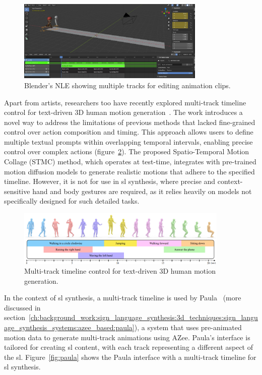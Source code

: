 \documentclass[../../main.tex]{subfiles}
\begin{document}
\begin{figure}
    \centering
    \includegraphics[width=0.8\textwidth]{chapters/background_work/images/nle_blender.png}
    \caption{Blender's NLE showing multiple tracks for editing animation clips.}
    \label{fig:nle_editor}
\end{figure}

Apart from artists, researchers too have recently explored multi-track timeline control for text-driven 3D human motion generation~\cite{petrovich24stmc}. The work introduces a novel way to address the limitations of previous methods that lacked fine-grained control over action composition and timing. This approach allows users to define multiple textual prompts within overlapping temporal intervals, enabling precise control over complex actions (figure~\ref{fig:multi_track_other}). The proposed Spatio-Temporal Motion Collage (STMC) method, which operates at test-time, integrates with pre-trained motion diffusion models to generate realistic motions that adhere to the specified timeline. However, it is not for use in \gls{sl} synthesis, where precise and context-sensitive hand and body gestures are required, as it relies heavily on models not specifically designed for such detailed tasks.

\begin{figure}
    \centering
    \includegraphics[width=0.9\textwidth]{chapters/background_work/images/multi_track_other.png}
    \caption{Multi-track timeline control for text-driven 3D human motion generation.}
    \label{fig:multi_track_other}
\end{figure}

In the context of \gls{sl} synthesis, a multi-track timeline is used by Paula~\cite{filhol2017synthesizing} (more discussed in section~\ref{ch:background_work:sign_language_synthesis:3d_techniques:sign_language_synthesis_systems:azee_based:paula}), a system that uses pre-animated motion data to generate multi-track animations using AZee. Paula's interface is tailored for creating \gls{sl} content, with each track representing a different aspect of the \gls{sl}. Figure~\ref{fig:paula} shows the Paula interface with a multi-track timeline for \gls{sl} synthesis.
\end{document}

